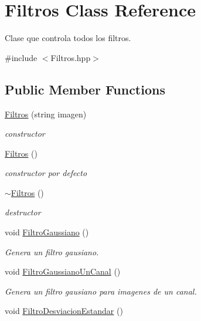 \hypertarget{class_filtros}{}\section{Filtros Class Reference}
\label{class_filtros}


Clase que controla todos los filtros.  




{\ttfamily \#include $<$Filtros.\+hpp$>$}

\subsection*{Public Member Functions}
\begin{DoxyCompactItemize}
\item 
\hyperlink{class_filtros_ada24dd279d9c0e4c95738162866bd261}{Filtros} (string imagen)
\begin{DoxyCompactList}\small\item\em constructor \end{DoxyCompactList}\item 
\hyperlink{class_filtros_a5d4383dece49dcc80b3ce18da579a338}{Filtros} ()
\begin{DoxyCompactList}\small\item\em constructor por defecto \end{DoxyCompactList}\item 
\hyperlink{class_filtros_ae0486e405aaac60c6f19eaef6b3b01df}{$\sim$\+Filtros} ()
\begin{DoxyCompactList}\small\item\em destructor \end{DoxyCompactList}\item 
void \hyperlink{class_filtros_a176534ec297bdde49cb959602eea0d29}{Filtro\+Gaussiano} ()
\begin{DoxyCompactList}\small\item\em Genera un filtro gausiano. \end{DoxyCompactList}\item 
void \hyperlink{class_filtros_a63c1da79fb2190ae07b354ee4ee67819}{Filtro\+Gaussiano\+Un\+Canal} ()
\begin{DoxyCompactList}\small\item\em Genera un filtro gausiano para imagenes de un canal. \end{DoxyCompactList}\item 
void \hyperlink{class_filtros_a81e2f015d497d80032af22f471b360eb}{Filtro\+Desviacion\+Estandar} ()

\end{DoxyCompactItemize}
